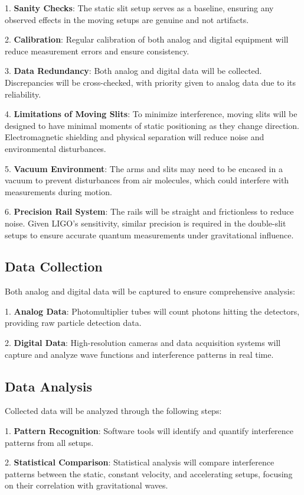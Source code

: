 \documentclass{article}
\begin{document}
1. \textbf{Sanity Checks}: The static slit setup serves as a baseline, ensuring any observed effects in the moving setups are genuine and not artifacts.
   
2. \textbf{Calibration}: Regular calibration of both analog and digital equipment will reduce measurement errors and ensure consistency.
   
3. \textbf{Data Redundancy}: Both analog and digital data will be collected. Discrepancies will be cross-checked, with priority given to analog data due to its reliability.
   
4. \textbf{Limitations of Moving Slits}: To minimize interference, moving slits will be designed to have minimal moments of static positioning as they change direction. Electromagnetic shielding and physical separation will reduce noise and environmental disturbances.

5. \textbf{Vacuum Environment}: The arms and slits may need to be encased in a vacuum to prevent disturbances from air molecules, which could interfere with measurements during motion.

6. \textbf{Precision Rail System}: The rails will be straight and frictionless to reduce noise. Given LIGO's sensitivity, similar precision is required in the double-slit setups to ensure accurate quantum measurements under gravitational influence.

\subsection{Data Collection}
Both analog and digital data will be captured to ensure comprehensive analysis:

1. \textbf{Analog Data}: Photomultiplier tubes will count photons hitting the detectors, providing raw particle detection data.

2. \textbf{Digital Data}: High-resolution cameras and data acquisition systems will capture and analyze wave functions and interference patterns in real time.

\subsection{Data Analysis}
Collected data will be analyzed through the following steps:

1. \textbf{Pattern Recognition}: Software tools will identify and quantify interference patterns from all setups.
   
2. \textbf{Statistical Comparison}: Statistical analysis will compare interference patterns between the static, constant velocity, and accelerating setups, focusing on their correlation with gravitational waves.
   
\end{document}
